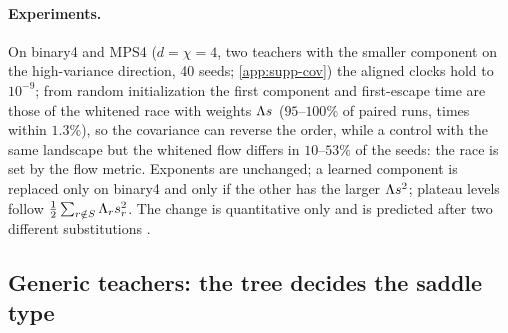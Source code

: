 \paragraph{Experiments.}
\empirical{} On binary4 and MPS4 ($d=\chi=4$, two teachers with the smaller component on the high-variance
direction, 40 seeds; \cref{app:supp-cov}) the aligned clocks hold to $10^{-9}$; from random initialization the
first component and first-escape time are those of the whitened race with weights $\Lambda s_{}$ ($95$--$100\%$ of
paired runs, times within $1.3\%$), so the covariance can reverse the order, while a control with the same
landscape but the whitened flow differs in $10$--$53\%$ of the seeds: the race is set by the flow metric.
Exponents are unchanged; a learned component is replaced only on binary4 and only if the other has the
larger $\Lambda s_{}^2$; plateau levels follow $\frac12\sum_{r\notin S}\Lambda_rs_{r}^2$. The change is quantitative only
and is predicted after two different substitutions .

\subsection{Generic teachers: the tree decides the saddle type}\label{sec:teacher-generic}

